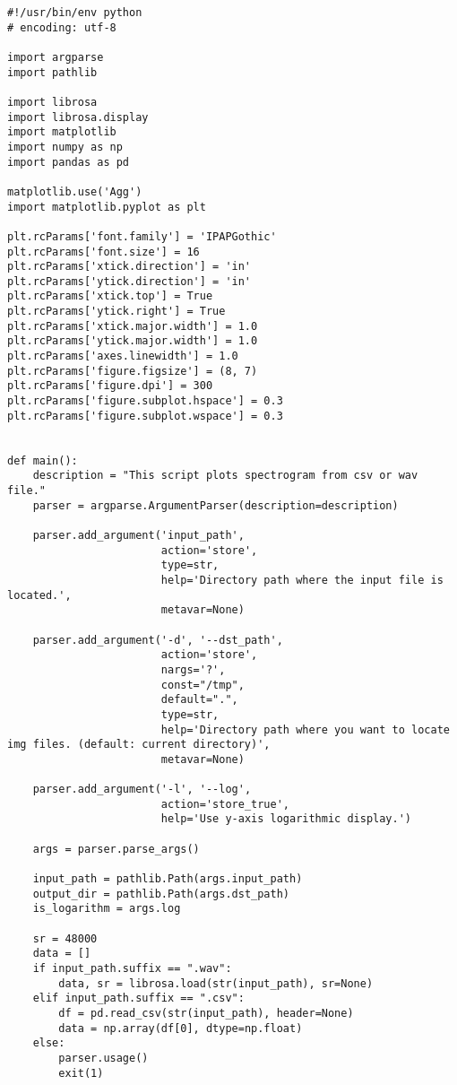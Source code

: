 \begin{lstlisting}[caption=plot\_spectrogram\_librosa.py,label=plot\_spectrogram\_librosa.py]
#!/usr/bin/env python
# encoding: utf-8

import argparse
import pathlib

import librosa
import librosa.display
import matplotlib
import numpy as np
import pandas as pd

matplotlib.use('Agg')
import matplotlib.pyplot as plt

plt.rcParams['font.family'] = 'IPAPGothic'
plt.rcParams['font.size'] = 16
plt.rcParams['xtick.direction'] = 'in'
plt.rcParams['ytick.direction'] = 'in'
plt.rcParams['xtick.top'] = True
plt.rcParams['ytick.right'] = True
plt.rcParams['xtick.major.width'] = 1.0
plt.rcParams['ytick.major.width'] = 1.0
plt.rcParams['axes.linewidth'] = 1.0
plt.rcParams['figure.figsize'] = (8, 7)
plt.rcParams['figure.dpi'] = 300
plt.rcParams['figure.subplot.hspace'] = 0.3
plt.rcParams['figure.subplot.wspace'] = 0.3


def main():
    description = "This script plots spectrogram from csv or wav file."
    parser = argparse.ArgumentParser(description=description)

    parser.add_argument('input_path',
                        action='store',
                        type=str,
                        help='Directory path where the input file is located.',
                        metavar=None)

    parser.add_argument('-d', '--dst_path',
                        action='store',
                        nargs='?',
                        const="/tmp",
                        default=".",
                        type=str,
                        help='Directory path where you want to locate img files. (default: current directory)',
                        metavar=None)

    parser.add_argument('-l', '--log',
                        action='store_true',
                        help='Use y-axis logarithmic display.')

    args = parser.parse_args()

    input_path = pathlib.Path(args.input_path)
    output_dir = pathlib.Path(args.dst_path)
    is_logarithm = args.log

    sr = 48000
    data = []
    if input_path.suffix == ".wav":
        data, sr = librosa.load(str(input_path), sr=None)
    elif input_path.suffix == ".csv":
        df = pd.read_csv(str(input_path), header=None)
        data = np.array(df[0], dtype=np.float)
    else:
        parser.usage()
        exit(1)


\end{lstlisting}
